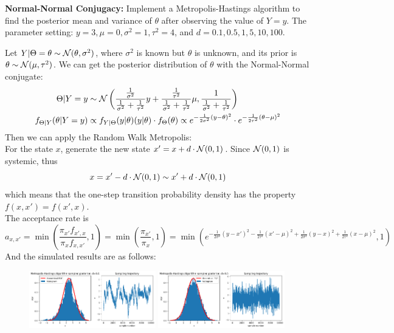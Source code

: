 \begin{homeworkProblem}

\textbf{Normal-Normal Conjugacy:} Implement a Metropolis-Hastings algorithm to find the posterior mean and variance of $\theta$ after observing the value of $Y=y$. The parameter setting: $y=3, \mu=0, \sigma^2=1, \tau^2=4$, and $d=0.1,0.5,1,5,10,100$.

\solution

Let $Y|\Theta=\theta\sim\mathcal{N}(\theta,\sigma^2)$, where $\sigma^2$ is known but $\theta$ is unknown, and its prior is $\theta\sim\mathcal{N}(\mu,\tau^2)$. We can get the posterior distribution of $\theta$ with the Normal-Normal conjugate:
\begin{align*}
\Theta|Y=y &\sim \mathcal{N}\left(\dfrac{\frac{1}{\sigma^2}}{\frac{1}{\sigma^2}+\frac{1}{\tau^2}}y+\dfrac{\frac{1}{\tau^2}}{\frac{1}{\sigma^2}+\frac{1}{\tau^2}}\mu, \dfrac{1}{\frac{1}{\sigma^2}+\frac{1}{\tau^2}}\right) \\
f_{\Theta|Y}(\theta|Y=y) &\propto f_{Y|\Theta}(y|\theta)(y|\theta)\cdot f_{\Theta}(\theta) \propto e^{-\frac{1}{2\sigma^2}(y-\theta)^2}\cdot e^{-\frac{1}{2\tau^2}(\theta-\mu)^2}
\end{align*}
Then we can apply the Random Walk Metropolis: \\
For the state $x$, generate the new state $x'=x+d\cdot\mathcal{N}(0,1)$. Since $\mathcal{N}(0,1)$ is systemic, thus
$$x=x'-d\cdot\mathcal{N}(0,1)\sim x'+d\cdot\mathcal{N}(0,1)$$
which means that the one-step transition probability density has the property $f(x,x')=f(x',x)$. \\
The acceptance rate is
$$a_{x,x'}=\min\left(\dfrac{\pi_{x'}f_{x',x}}{\pi_{x}f_{x,x'}},1\right)=\min\left(\dfrac{\pi_{x'}}{\pi_{x}},1\right)=\min\left(e^{-\frac{1}{2\sigma^2}(y-x')^2-\frac{1}{2\tau^2}(x'-\mu)^2 +\frac{1}{2\sigma^2}(y-x)^2+\frac{1}{2\tau^2}(x-\mu)^2},1\right)$$
And the simulated results are as follows:
\begin{figure}[h]
    \centering
    \includegraphics[width=0.49\textwidth]{./figure/p6/0.1.png}
    \includegraphics[width=0.49\textwidth]{./figure/p6/0.5.png}

\end{figure}
\end{homeworkProblem}
